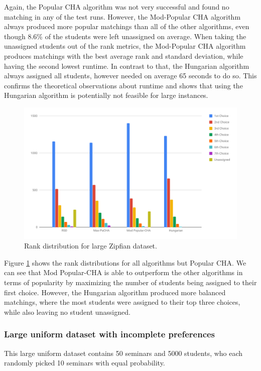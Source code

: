 Again, the Popular CHA algorithm was not very successful and found no matching in any of the test runs. However, the Mod-Popular CHA algorithm always produced more popular matchings than all of the other algorithms, even though 8.6\% of the students were left unassigned on average. When taking the unassigned students out of the rank metrics, the Mod-Popular CHA algorithm produces matchings with the best average rank and standard deviation, while having the second lowest runtime. In contrast to that, the Hungarian algorithm always assigned all students, however needed on average 65 seconds to do so. This confirms the theoretical observations about runtime and shows that using the Hungarian algorithm is potentially not feasible for large instances.

\begin{figure}[h!]
  \centering
    \includegraphics[width=0.9\linewidth]{assets/plots/zipfian-medium.pdf}
    \caption{Rank distribution for large Zipfian dataset.}
    \label{fig:zipfian-medium-distribution}
\end{figure}

Figure \ref{fig:zipfian-medium-distribution} shows the rank distributions for all algorithms but Popular CHA. We can see that Mod Popular-CHA is able to outperform the other algorithms in terms of popularity by maximizing the number of students being assigned to their first choice. However, the Hungarian algorithm produced more balanced matchings, where the most students were assigned to their top three choices, while also leaving no student unassigned.

\subsubsection{Large uniform dataset with incomplete preferences}
This large uniform dataset contains 50 seminars and 5000 students, who each randomly picked 10 seminars with equal probability.  

